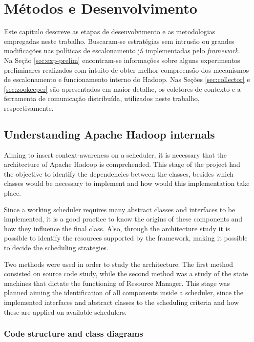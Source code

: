\chapter{Métodos e Desenvolvimento}
Este capítulo descreve as etapas de desenvolvimento e as metodologias empregadas neste trabalho. Buscaram-se estratégias sem intrusão ou grandes modificações nas políticas de escalonamento já implementadas pelo \textit{framework}. Na Seção \ref{sec:exp-prelim} encontram-se informações sobre alguns experimentos preliminares realizados com intuito de obter melhor compreensão dos mecanismos de escalonamento e funcionamento interno do Hadoop. Nas Seções \ref{sec:collector} e \ref{sec:zookeeper} são apresentados em maior detalhe, os coletores de contexto e a ferramenta de comunicação distribuída, utilizados neste trabalho, respectivamente. 


\section{Understanding Apache Hadoop internals}
\label{sec:grafo}
Aiming to insert context-awareness on a scheduler, it is necessary that the architecture of Apache Hadoop is comprehended. This stage of the project had the objective to identify the dependencies between the classes, besides which classes would be necessary to implement and how would this implementation take place.

Since a working scheduler requires many abstract classes and interfaces to be implemented, it is a good practice to know the origins of these components and how they influence the final class. Also, through the architecture study  it is possible to identify the resources supported by the framework, making it possible to decide the scheduling strategies.

Two methods were used in order to study the architecture. The first method consisted on source code study, while the second method was a study of the state machines that dictate the functioning of Resource Manager. This stage was planned aiming  the identification of all components inside a scheduler, since the implemented interfaces and abstract classes to the scheduling criteria and how these are applied on available schedulers.

\subsection{Code structure and class diagrams}

